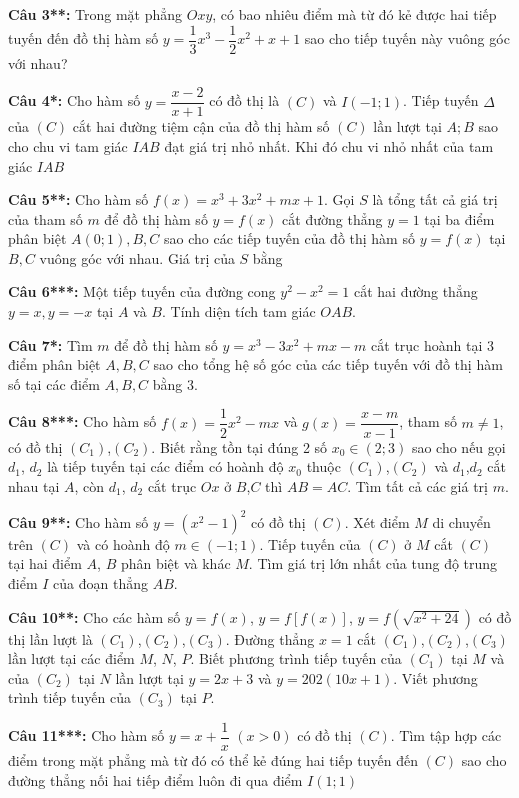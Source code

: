\documentclass[12pt, a4paper]{article}
\begin{document}
		\textbf{Câu 3**: } Trong mặt phẳng $Oxy$, có bao nhiêu điểm mà từ đó kẻ được hai tiếp tuyến đến đồ thị hàm số $y=\dfrac{1}{3}x^3-\dfrac{1}{2}x^2+x+1$ sao cho tiếp tuyến này vuông góc với nhau?
		
		\textbf{Câu 4*: } Cho hàm số $y=\dfrac{x-2}{x+1}$ có đồ thị là $(C)$ và $I(-1;1)$. Tiếp tuyến $\Delta$ của $(C)$ cắt hai đường tiệm cận của đồ thị hàm số $(C)$ lần lượt tại $A;B$ sao cho chu vi tam giác $IAB$ đạt giá trị nhỏ nhất. Khi đó chu vi nhỏ nhất của tam giác $IAB$
		
		\textbf{Câu 5**: } Cho hàm số $f(x)=x^3+3x^2+mx+1$. Gọi $S$ là tổng tất cả giá trị của tham số $m$ để đồ thị hàm số $y=f(x)$ cắt đường thẳng $y=1$ tại ba điểm phân biệt $A(0;1), B, C$ sao cho các tiếp tuyến của đồ thị hàm số $y=f(x)$ tại $B,C$ vuông góc với nhau. Giá trị của $S$ bằng
		
		\textbf{Câu 6***: } Một tiếp tuyến của đường cong $y^2-x^2=1$ cắt hai đường thẳng $y=x,y=-x$ tại $A$ và $B$. Tính diện tích tam giác $OAB$.
		
		\textbf{Câu 7*: } Tìm $m$ để đồ thị hàm số $y=x^3-3x^2+mx-m$ cắt trục hoành tại 3 điểm phân biệt $A,B,C$ sao cho tổng hệ số góc của các tiếp tuyến với đồ thị hàm số tại các điểm $A,B,C$ bằng 3.
		
		\textbf{Câu 8***: } Cho hàm số $f(x)=\dfrac{1}{2}x^2-mx$ và $g(x)=\dfrac{x-m}{x-1}$, tham số $m\neq1$, có đồ thị $(C_1)$,$(C_2)$. Biết rằng tồn tại đúng 2 số $x_0 \in (2;3)$ sao cho nếu gọi $d_1$, $d_2$ là tiếp tuyến tại các điểm có hoành độ $x_0$ thuộc $(C_1)$,$(C_2)$ và $d_1$,$d_2$ cắt nhau tại $A$, còn $d_1$, $d_2$ cắt trục $Ox$ ở $B$,$C$ thì $AB=AC$. Tìm tất cả các giá trị $m$.
		
		\textbf{Câu 9**: } Cho hàm số $y=(x^2-1)^2$ có đồ thị $(C)$. Xét điểm $M$ di chuyển trên $(C)$ và có hoành độ $m\in (-1;1)$. Tiếp tuyến của $(C)$ ở $M$ cắt $(C)$ tại hai điểm $A$, $B$ phân biệt và khác $M$. Tìm giá trị lớn nhất của tung độ trung điểm $I$ của đoạn thẳng $AB$.
		
		\textbf{Câu 10**: } Cho các hàm số $y=f(x)$, $y=f\left[f(x)\right]$, $y=f\left( \sqrt{x^2+24} \right)$ có đồ thị lần lượt là $(C_1)$,$(C_2)$,$(C_3)$. Đường thẳng $x=1$ cắt $(C_1)$,$(C_2)$,$(C_3)$ lần lượt tại các điểm $M$, $N$, $P$. Biết phương trình tiếp tuyến của $(C_1)$ tại $M$ và của $(C_2)$ tại $N$ lần lượt tại $y=2x+3$ và $y=202(10x+1)$. Viết phương trình tiếp tuyến của $(C_3)$ tại $P$. 
		
		\textbf{Câu 11***: } Cho hàm số $y=x+\dfrac{1}{x}$ $(x>0)$ có đồ thị $(C)$. Tìm tập hợp các điểm trong mặt phẳng mà từ đó có thể kẻ đúng hai tiếp tuyến đến $(C)$ sao cho đường thẳng nối hai tiếp điểm luôn đi qua điểm $I(1;1)$
		
\end{document}
